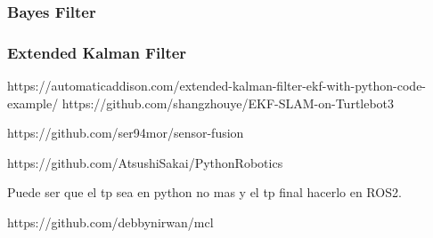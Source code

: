 \begin{frame}
	\frametitle{Bayes Filter}
	
	
	
\end{frame}

\begin{frame}
	\frametitle{Extended Kalman Filter}
	
    
    https://automaticaddison.com/extended-kalman-filter-ekf-with-python-code-example/
    https://github.com/shangzhouye/EKF-SLAM-on-Turtlebot3
    
    https://github.com/ser94mor/sensor-fusion
    
    https://github.com/AtsushiSakai/PythonRobotics
    
    Puede ser que el tp sea en python no mas y el tp final hacerlo en ROS2.
    
    https://github.com/debbynirwan/mcl
    
    
\end{frame}

